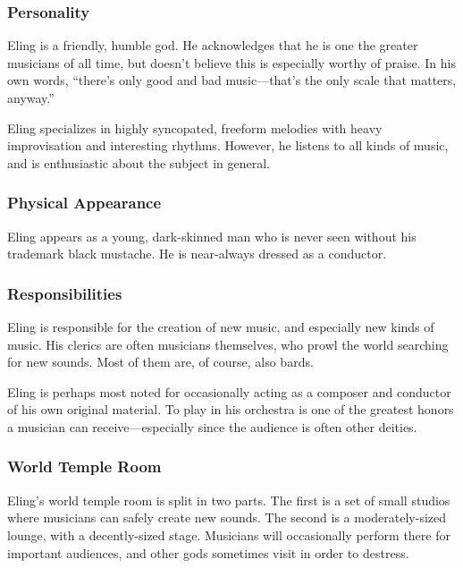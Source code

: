 \subsubsection*{Personality}
Eling is a friendly, humble god.
He acknowledges that he is one the greater musicians of all time, but doesn't believe this is especially worthy of praise.
In his own words, ``there's only good and bad music---that's the only scale that matters, anyway.''

Eling specializes in highly syncopated, freeform melodies with heavy improvisation and interesting rhythms.
However, he listens to all kinds of music, and is enthusiastic about the subject in general.

\subsubsection*{Physical Appearance}
Eling appears as a young, dark-skinned man who is never seen without his trademark black mustache.
He is near-always dressed as a conductor.

\subsubsection*{Responsibilities}
Eling is responsible for the creation of new music, and especially new kinds of music.
His clerics are often musicians themselves, who prowl the world searching for new sounds.
Most of them are, of course, also bards.

Eling is perhaps most noted for occasionally acting as a composer and conductor of his own original material.
To play in his orchestra is one of the greatest honors a musician can receive---especially since the audience is often other deities.

\subsubsection*{World Temple Room}
Eling's world temple room is split in two parts.
The first is a set of small studios where musicians can safely create new sounds.
The second is a moderately-sized lounge, with a decently-sized stage.
Musicians will occasionally perform there for important audiences, and other gods sometimes visit in order to destress.



